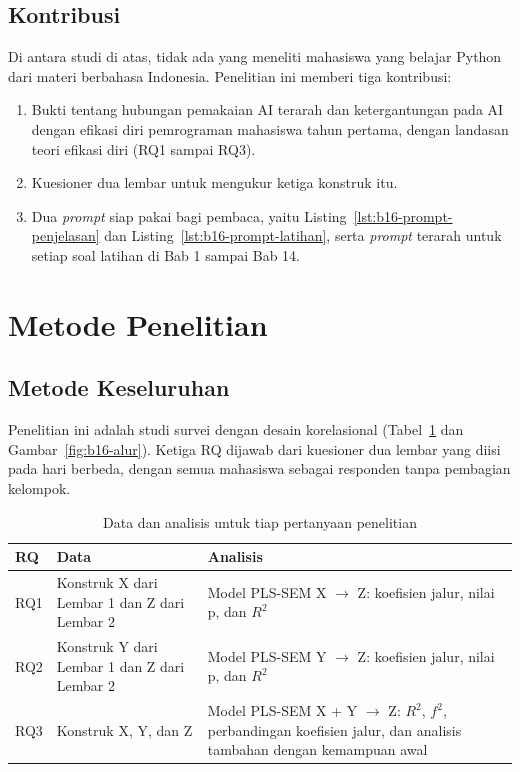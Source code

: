 \subsection{Kontribusi}

Di antara studi di atas, tidak ada yang meneliti mahasiswa yang belajar Python dari materi berbahasa Indonesia.  Penelitian ini memberi tiga kontribusi:

\begin{enumerate}
  \item Bukti tentang hubungan pemakaian AI terarah dan ketergantungan pada AI dengan efikasi diri pemrograman mahasiswa tahun pertama, dengan landasan teori efikasi diri (RQ1 sampai RQ3).
  \item Kuesioner dua lembar untuk mengukur ketiga konstruk itu.
  \item Dua \textit{prompt} siap pakai bagi pembaca, yaitu Listing~\ref{lst:b16-prompt-penjelasan} dan Listing~\ref{lst:b16-prompt-latihan}, serta \textit{prompt} terarah untuk setiap soal latihan di Bab 1 sampai Bab 14.
\end{enumerate}

\section{Metode Penelitian}
\label{sec:b16-metode}

\subsection{Metode Keseluruhan}
\label{sec:b16-metode-umum}

Penelitian ini adalah studi survei dengan desain korelasional (Tabel~\ref{tab:b16-rancangan} dan Gambar~\ref{fig:b16-alur}). Ketiga RQ dijawab dari kuesioner dua lembar yang diisi pada hari berbeda, dengan semua mahasiswa sebagai responden tanpa pembagian kelompok.

\begin{table}[H]
  \centering
  \caption{Data dan analisis untuk tiap pertanyaan penelitian}
  \label{tab:b16-rancangan}
  \begin{tabularx}{\textwidth}{lXX}
    \hline
    \textbf{RQ} & \textbf{Data} & \textbf{Analisis} \\
    \hline
    RQ1 & Konstruk X dari Lembar 1 dan Z dari Lembar 2 & Model PLS-SEM X $\rightarrow$ Z: koefisien jalur, nilai p, dan $R^2$ \\
    \hline
    RQ2 & Konstruk Y dari Lembar 1 dan Z dari Lembar 2 & Model PLS-SEM Y $\rightarrow$ Z: koefisien jalur, nilai p, dan $R^2$ \\
    \hline
    RQ3 & Konstruk X, Y, dan Z & Model PLS-SEM X + Y $\rightarrow$ Z: $R^2$, $f^2$, perbandingan koefisien jalur, dan analisis tambahan dengan kemampuan awal \\
    \hline
  \end{tabularx}
\end{table}

